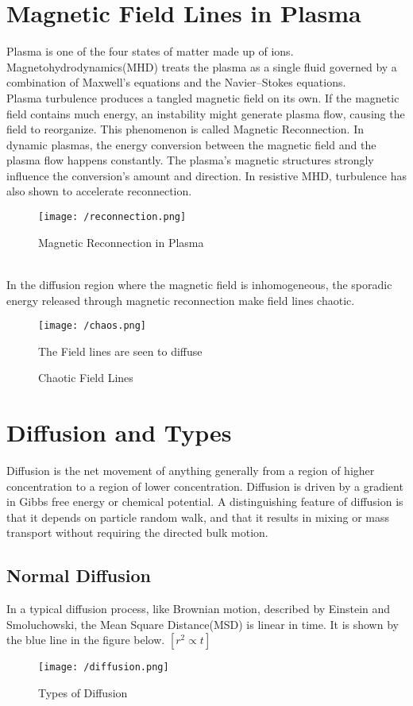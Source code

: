 \documentclass[fleqn]{report}
\begin{document}
	\section{Magnetic Field Lines in Plasma}
	Plasma is one of the four states of matter made up of ions. Magnetohydrodynamics(MHD) treats the plasma as a single fluid governed by a combination of Maxwell's equations and the Navier–Stokes equations.\\
	Plasma turbulence produces a tangled magnetic field on its own. If the magnetic field contains much energy, an instability might generate plasma flow, causing the field to reorganize. This phenomenon is called Magnetic Reconnection. In dynamic plasmas, the energy conversion between the magnetic field and the plasma flow happens constantly. The plasma's magnetic structures strongly influence the conversion's amount and direction. In resistive MHD, turbulence has also shown to accelerate reconnection.\\
	\begin{figure}[!h]
		\centering
		\texttt{[image: /reconnection.png]}
		\caption{Magnetic Reconnection in Plasma}
		\label{fig:recon}
	\end{figure}\\
	 In the diffusion region where the magnetic field is inhomogeneous, the sporadic energy released through magnetic reconnection make field lines chaotic.
	\begin{figure}[!ht]
		\centering
		\texttt{[image: /chaos.png]}
		\caption{Chaotic Field Lines}{The Field lines are seen to diffuse}
		\label{fig:chaos}
	\end{figure}
	\section{Diffusion and Types}
	 Diffusion is the net movement of anything generally from a region of higher concentration to a region of lower concentration. Diffusion is driven by a gradient in Gibbs free energy or chemical potential. A distinguishing feature of diffusion is that it depends on particle random walk, and that it results in mixing or mass transport without requiring the directed bulk motion.
	 \subsection{Normal Diffusion}
	  In a typical diffusion process, like Brownian motion, described by Einstein and Smoluchowski, the Mean Square Distance(MSD) is linear in time. It is shown by the blue line in the figure below. $[r^{2} \propto t]$\\
	  \begin{figure}[!ht]
	  	\centering
	  	\texttt{[image: /diffusion.png]}
	  	\caption{Types of Diffusion}
	  	\label{fig:diff}
	  \end{figure}
\end{document}
